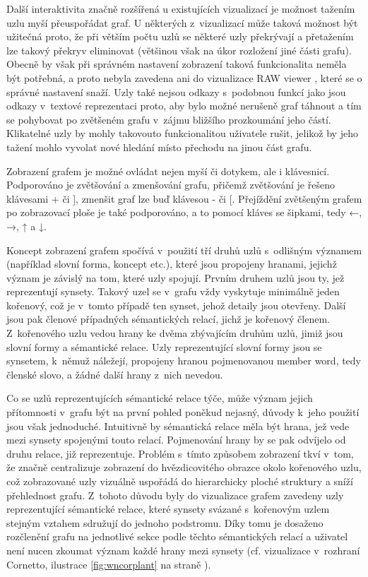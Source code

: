 \documentclass[a4paper,11pt,openany,twoside]{book}
\newcommand{\simplywn}{RAW viewer }
\newcommand\ex{\textsf}
\begin{document}
				Další interaktivita značně rozšířená u existujících vizualizací je možnost tažením uzlu myší přeuspořádat graf. U některých z~vizualizací může taková možnost být užitečná proto, že při větším počtu uzlů se některé uzly překrývají a přetažením lze takový překryv eliminovat (většinou však na úkor rozložení jiné části grafu). Obecně by však při správném nastavení zobrazení taková funkcionalita neměla být potřebná, a proto nebyla zavedena ani do vizualizace \simplywn, které se o správné nastavení snaží. Uzly také nejsou odkazy s~podobnou funkcí jako jsou odkazy v~textové reprezentaci proto, aby bylo možné nerušeně graf táhnout a tím se pohybovat po zvětšeném grafu v~zájmu bližšího prozkoumání jeho částí. Klikatelné uzly by mohly takovouto funkcionalitou uživatele rušit, jelikož by jeho tažení mohlo vyvolat nové hledání místo přechodu na jinou část grafu.

				Zobrazení grafem je možné ovládat nejen myší či dotykem, ale i klávesnicí. Podporováno je zvětšování a zmenšování grafu, přičemž zvětšování je řešeno klávesami \ex{+} či \ex{]}, zmenšit graf lze buď klávesou \ex{-} či \ex{[}. Přejíždění zvětšeným grafem po zobrazovací ploše je také podporováno, a to pomocí kláves se šipkami, tedy \ex{←}, {→}, {↑} a {↓}.


				Koncept zobrazení grafem spočívá v~použití tří druhů uzlů s~odlišným významem (například slovní forma, koncept etc.), které jsou propojeny hranami, jejichž význam je závislý na tom, které uzly spojují. Prvním druhem uzlů jsou ty, jež reprezentují synsety. Takový uzel se v~grafu vždy vyskytuje minimálně jeden kořenový, což je v~tomto případě ten synset, jehož detaily jsou otevřeny. Další jsou pak členové případných sémantických relací, jichž je kořenový členem. Z~kořenového uzlu vedou hrany ke dvěma zbývajícím druhům uzlů, jimiž jsou slovní formy a sémantické relace. Uzly reprezentující slovní formy jsou se synsetem, k~němuž náležejí, propojeny hranou pojmenovanou \ex{member word}, tedy členské slovo, a žádné další hrany z~nich nevedou. 

				Co se uzlů reprezentujících sémantické relace týče, může význam jejich přítomnosti v~grafu být na první pohled poněkud nejasný, důvody k~jeho použití jsou však jednoduché. Intuitivně by sémantická relace měla být hrana, jež vede mezi synsety spojenými touto relací. Pojmenování hrany by se pak odvíjelo od druhu relace, již reprezentuje. Problém s~tímto způsobem zobrazení tkví v~tom, že značně centralizuje zobrazení do hvězdicovitého obrazce okolo kořenového uzlu, což zobrazované uzly vizuálně uspořádá do hierarchicky ploché struktury a sníží přehlednost grafu. Z~tohoto důvodu byly do vizualizace grafem zavedeny uzly reprezentující sémantické relace, které synsety svázané s~kořenovým uzlem stejným vztahem sdružují do jednoho podstromu. Díky tomu je dosaženo rozčlenění grafu na jednotlivé sekce podle těchto sémantických relací a uživatel není nucen zkoumat význam každé hrany mezi synsety (cf. vizualizace v~rozhraní Cornetto, ilustrace \ref{fig:wncorplant} na straně \pageref{fig:wncorplant}).
\end{document}
